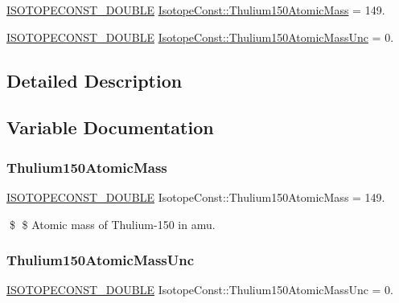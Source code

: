 \begin{DoxyCompactItemize}
\item 
\mbox{\hyperlink{group___isotope_const-_macros_ga8f45a7272ce02c0b4c65c44636ed719a}{I\+S\+O\+T\+O\+P\+E\+C\+O\+N\+S\+T\+\_\+\+D\+O\+U\+B\+LE}} \mbox{\hyperlink{group___isotope_const-_thulium-_tm150_ga8f48f111f0320b302f88cd9d87611472}{Isotope\+Const\+::\+Thulium150\+Atomic\+Mass}} = 149.
\item 
\mbox{\hyperlink{group___isotope_const-_macros_ga8f45a7272ce02c0b4c65c44636ed719a}{I\+S\+O\+T\+O\+P\+E\+C\+O\+N\+S\+T\+\_\+\+D\+O\+U\+B\+LE}} \mbox{\hyperlink{group___isotope_const-_thulium-_tm150_ga125984522104e1c3bb589ff0499e2d64}{Isotope\+Const\+::\+Thulium150\+Atomic\+Mass\+Unc}} = 0.
\end{DoxyCompactItemize}


\subsection{Detailed Description}


\subsection{Variable Documentation}
\mbox{\label{group___isotope_const-_thulium-_tm150_ga8f48f111f0320b302f88cd9d87611472}} 
\subsubsection{\texorpdfstring{Thulium150\+Atomic\+Mass}{Thulium150AtomicMass}}
{\footnotesize\ttfamily \mbox{\hyperlink{group___isotope_const-_macros_ga8f45a7272ce02c0b4c65c44636ed719a}{I\+S\+O\+T\+O\+P\+E\+C\+O\+N\+S\+T\+\_\+\+D\+O\+U\+B\+LE}} Isotope\+Const\+::\+Thulium150\+Atomic\+Mass = 149.}

\$ \$ Atomic mass of Thulium-\/150 in amu. \mbox{\label{group___isotope_const-_thulium-_tm150_ga125984522104e1c3bb589ff0499e2d64}} 
\subsubsection{\texorpdfstring{Thulium150\+Atomic\+Mass\+Unc}{Thulium150AtomicMassUnc}}
{\footnotesize\ttfamily \mbox{\hyperlink{group___isotope_const-_macros_ga8f45a7272ce02c0b4c65c44636ed719a}{I\+S\+O\+T\+O\+P\+E\+C\+O\+N\+S\+T\+\_\+\+D\+O\+U\+B\+LE}} Isotope\+Const\+::\+Thulium150\+Atomic\+Mass\+Unc = 0.}

